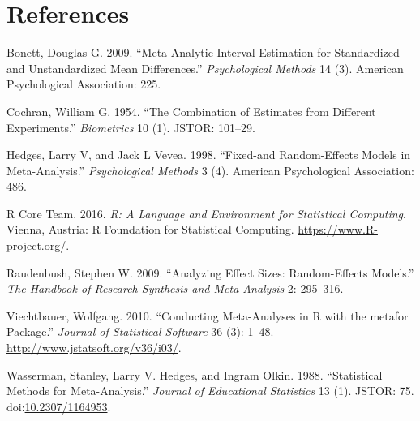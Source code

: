 \documentclass[]{elsarticle} %
\begin{document}
\section*{References}\label{references}

Bonett, Douglas G. 2009. ``Meta-Analytic Interval Estimation for
Standardized and Unstandardized Mean Differences.'' \emph{Psychological
Methods} 14 (3). American Psychological Association: 225.

Cochran, William G. 1954. ``The Combination of Estimates from Different
Experiments.'' \emph{Biometrics} 10 (1). JSTOR: 101--29.

Hedges, Larry V, and Jack L Vevea. 1998. ``Fixed-and Random-Effects
Models in Meta-Analysis.'' \emph{Psychological Methods} 3 (4). American
Psychological Association: 486.

R Core Team. 2016. \emph{R: A Language and Environment for Statistical
Computing}. Vienna, Austria: R Foundation for Statistical Computing.
\url{https://www.R-project.org/}.

Raudenbush, Stephen W. 2009. ``Analyzing Effect Sizes: Random-Effects
Models.'' \emph{The Handbook of Research Synthesis and Meta-Analysis} 2:
295--316.

Viechtbauer, Wolfgang. 2010. ``Conducting Meta-Analyses in R with the
metafor Package.'' \emph{Journal of Statistical Software} 36 (3): 1--48.
\url{http://www.jstatsoft.org/v36/i03/}.

Wasserman, Stanley, Larry V. Hedges, and Ingram Olkin. 1988.
``Statistical Methods for Meta-Analysis.'' \emph{Journal of Educational
Statistics} 13 (1). JSTOR: 75.
doi:\href{http://dx.doi.org/10.2307/1164953}{10.2307/1164953}.
\end{document}
